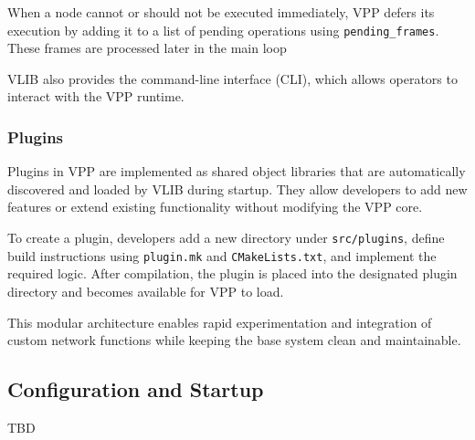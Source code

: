 When a node cannot or should not be executed immediately, 
VPP defers its execution by adding it to a list of pending operations using \texttt{pending\_frames}.
These frames are processed later in the main loop

VLIB also provides the command-line interface (CLI), which allows operators to interact with the VPP runtime.\cite{fdio-vpp-vlib-2506}

\subsubsection{Plugins}
Plugins in VPP are implemented as shared object libraries that are automatically discovered and loaded by VLIB during startup. 
They allow developers to add new features or extend existing functionality without modifying the VPP core.

To create a plugin, developers add a new directory under \texttt{src/plugins}, define build instructions using \texttt{plugin.mk} and \texttt{CMakeLists.txt}, and implement the required logic. 
After compilation, the plugin is placed into the designated plugin directory and becomes available for VPP to load.

This modular architecture enables rapid experimentation and integration of custom network functions while keeping the base system clean and maintainable.\cite{fdio-vpp-plugins-2506, fdio-vpp-addplugin-2506}

\subsection{Configuration and Startup}
TBD
